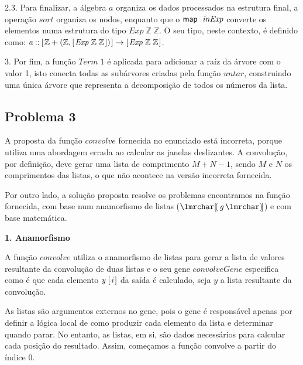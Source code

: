 \documentclass[11pt, a4paper, fleqn]{article}
\newcommand{\Conid}[1]{\mathit{#1}}
\newcommand{\Varid}[1]{\mathit{#1}}
\begin{document}
2.3. Para finalizar, a álgebra \ensuremath{\Varid{a}} organiza os dados processados na estrutura final, a operação \ensuremath{\Varid{sort}} organiza os nodos, enquanto que o \ensuremath{\map \;\Varid{inExp}} converte os elementos numa estrutura do tipo \ensuremath{\Conid{Exp}\;\mathbb{Z}\;\mathbb{Z}}.
O seu tipo, neste contexto, é definido como: \ensuremath{\Varid{a}\mathbin{::}[\mskip1.5mu \mathbb{Z}+(\mathbb{Z},[\mskip1.5mu \Conid{Exp}\;\mathbb{Z}\;\mathbb{Z}\mskip1.5mu])\mskip1.5mu]\to [\mskip1.5mu \Conid{Exp}\;\mathbb{Z}\;\mathbb{Z}\mskip1.5mu]}.

3. Por fim, a função \ensuremath{\Conid{Term}\;\mathrm{1}} é aplicada para adicionar a raíz da árvore com o valor 1, isto conecta todas as subárvores criadas pela função \ensuremath{\Varid{untar}}, construindo uma única árvore que representa a decomposição de todos os números da lista.

\subsection*{Problema 3}

A proposta da função \ensuremath{\Varid{convolve}} fornecida no enunciado está incorreta, porque utiliza uma abordagem errada ao calcular as janelas deslizantes.
A convolução, por definição, deve gerar uma lista de comprimento \ensuremath{\Conid{M}\mathbin{+}\Conid{N}\mathbin{-}\mathrm{1}}, sendo \ensuremath{\Conid{M}} e \ensuremath{\Conid{N}} os comprimentos das listas, o que não acontece na versão incorreta fornecida.

Por outro lado, a solução proposta resolve os problemas encontramos na função fornecida, com base num anamorfismo de listas (\ensuremath{\anaList{\Varid{g}}}) e com base matemática.

\textbf{1. Anamorfismo}

A função \ensuremath{\Varid{convolve}} utiliza o anamorfismo de listas para gerar a lista de valores resultante da convolução de duas listas e
o seu gene \ensuremath{\Varid{convolveGene}} especifica como é que cada elemento \ensuremath{\Varid{y}\;[\mskip1.5mu \Varid{i}\mskip1.5mu]} da saída é calculado, seja \ensuremath{\Varid{y}} a lista resultante da convolução.

As listas são argumentos externos no gene, pois o gene é responsável apenas por definir a lógica local de como produzir cada 
elemento da lista e determinar quando parar. No entanto, as listas, em si, são dados necessários para calcular cada posição 
do resultado. Assim, começamos a função convolve a partir do índice 0.
\end{document}
